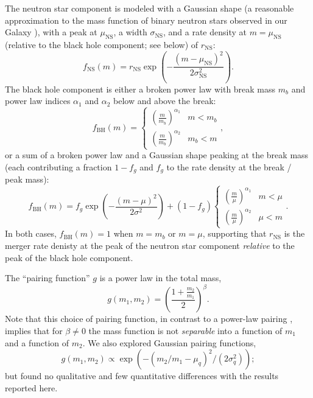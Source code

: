 \documentclass[modern]{aastex631}
\begin{document}
The neutron star component is modeled with a Gaussian shape (a reasonable
approximation to the mass function of binary neutron stars observed in our
Galaxy \citep{Farr2020,Alsing2018}), with a peak at $\mu_\mathrm{NS}$, a width
$\sigma_\mathrm{NS}$, and a rate density at $m = \mu_\mathrm{NS}$ (relative to
the black hole component; see below) of $r_\mathrm{NS}$:
\begin{equation}
    f_\mathrm{NS}(m) = r_\mathrm{NS} \exp\left( - \frac{\left( m - \mu_\mathrm{NS} \right)^2}{2 \sigma_\mathrm{NS}^2} \right).
\end{equation}
The black hole component is either a broken power law with break mass $m_b$ and
power law indices $\alpha_1$ and $\alpha_2$ below and above the break:
\begin{equation}
    f_\mathrm{BH}(m) = \begin{cases}
        \left( \frac{m}{m_b} \right)^{\alpha_1} & m < m_b \\
        \left( \frac{m}{m_b} \right)^{\alpha_2} & m_b < m
    \end{cases}, 
\end{equation}
or a sum of a broken power law and a Gaussian shape peaking at the break mass
(each contributing a fraction $1-f_g$ and $f_g$ to the rate density at the break
/ peak mass):
\begin{equation}
    f_\mathrm{BH}(m) = f_g \exp\left( - \frac{\left( m - \mu \right)^2}{2 \sigma^2} \right) + \left( 1 - f_g \right) 
    \begin{cases}
        \left( \frac{m}{\mu} \right)^{\alpha_1} & m < \mu \\
        \left( \frac{m}{\mu} \right)^{\alpha_2} & \mu < m
    \end{cases}.
\end{equation}
In both cases, $f_\mathrm{BH}(m) = 1$ when $m = m_b$ or $m = \mu$, supporting
that $r_\mathrm{NS}$ is the merger rate denisty at the peak of the neutron star
component \emph{relative} to the peak of the black hole component.

The ``pairing function'' \citep{Fishbach2020} $g$ is a power law in the total
mass,
\begin{equation}
    g(m_1, m_2) = \left( \frac{1 + \frac{m_2}{m_1}}{2} \right)^{\beta}.
\end{equation}
Note that this choice of pairing function, in contrast to a power-law pairing
\citep{KAGRA:2021duu}, implies that for $\beta \neq 0$ the mass function is not
\emph{separable} into a function of $m_1$ and a function of $m_2$.  We also
explored Gaussian pairing functions,
\begin{equation}
    g\left(m_1, m_2 \right) \propto \exp\left( - \left( m_2/m_1 - \mu_q \right)^2 /
\left( 2 \sigma_q^2 \right) \right);
\end{equation} 
but found no qualitative and few quantitative differences with the results
reported here.
\end{document}
